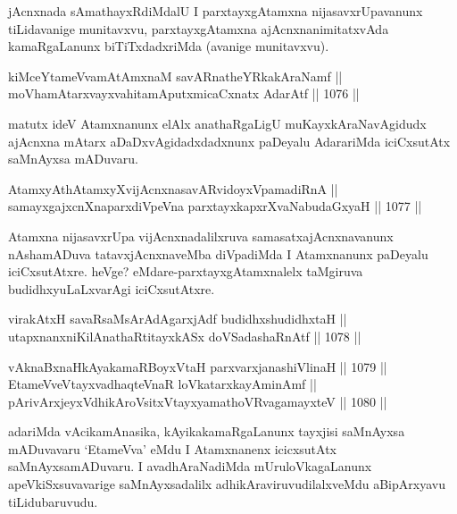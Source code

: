 \begin{artha}
jAcnxnada sAmathayxRdiMdalU I parxtayxgAtamxna nijasavxrUpavanunx tiLidavanige munitavxvu, parxtayxgAtamxna ajAcnxnanimitatxvAda kamaRgaLanunx biTiTxdadxriMda (avanige munitavxvu).
\end{artha}


\begin{shl}
kiMceYtameVvamAtAmxnaM savARnatheYRkakAraNamf || \\
moVhamAtarxvayxvahitamAputxmicaCxnatx AdarAtf \hfill || 1076 ||  
\end{shl}

\begin{artha}
matutx ideV Atamxnanunx elAlx anathaRgaLigU muKayxkAraNavAgidudx ajAcnxna mAtarx aDaDxvAgidadxdadxnunx paDeyalu AdarariMda iciCxsutAtx saMnAyxsa mADuvaru.
\end{artha}


\begin{shl}
AtamxyAthAtamxyXvijAcnxnasavARvidoyxVpamadiRnA || \\
samayxgajxcnXnaparxdiVpeVna parxtayxkapxrXvaNabudaGxyaH \hfill || 1077 ||  
\end{shl}

\begin{artha}
Atamxna nijasavxrUpa vijAcnxnadalilxruva samasatxajAcnxnavanunx nAshamADuva tatavxjAcnxnaveMba diVpadiMda I Atamxnanunx paDeyalu iciCxsutAtxre. heVge? eMdare-parxtayxgAtamxnalelx taMgiruva budidhxyuLaLxvarAgi iciCxsutAtxre.
\end{artha}

\begin{shl}
virakAtxH savaRsaMsArAdAgarxjAdf budidhxshudidhxtaH || \\
utapxnanxniKilAnathaRtitayxkASx doVSadashaRnAtf \hfill || 1078 ||  
\end{shl}
				
\begin{shl}
vAknaBxnaHkAyakamaRBoyxV\s taH parxvarxjanashiVlinaH \hfill || 1079 ||  \\
EtameVveVtayxvadhaqteVnaR loVkatarxkayAminAmf || \\
pArivArxjeyxV\s dhikAroV\s sitxVtayxyamathoVR\s vagamayxteV \hfill || 1080 ||  
\end{shl}

\begin{artha}
adariMda vAcikamAnasika, kAyikakamaRgaLanunx tayxjisi saMnAyxsa mADuvavaru `EtameVva' eMdu I Atamxnanenx icicxsutAtx saMnAyxsamADuvaru. I avadhAraNadiMda mUruloVkagaLanunx apeVkiSxsuvavarige saMnAyxsadalilx adhikAraviruvudilalxveMdu aBipArxyavu tiLidubaruvudu.
\end{artha}

